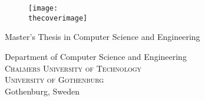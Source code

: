 
\newcommand{\oneLineTitle}{\thetitle}
\newcommand{\multiLineTitle}{\thetitle}

\begin{titlepage}

\addtolength{\voffset}{2cm}

\ifdefined\thecoverimage
\begin{figure}[H]
\centering
\vspace{1cm}
\texttt{[image: \\thecoverimage]}
\end{figure}
\else
\vspace{1cm}
\fi

\setlength{\parindent}{0cm}
\setlength{\parskip}{0cm}

\mbox{}
\vfill
{\sf
  \textbf{\Huge \multiLineTitle} \vspace{\baselineskip}\vspace{0.5cm}

  \ifdefined\thesubtitle
  {\Large \thesubtitle}  \vspace{\baselineskip}\vspace{0.5cm}
  \fi

  Master's Thesis in Computer Science and Engineering

  \vspace{1em}

  {\Large \theauthor}

  \vspace{2.9cm}

  Department of Computer Science and Engineering \\
  {\normalfont \textsc{Chalmers University of Technology}} \\
  {\normalfont \textsc{University of Gothenburg}} \\
  Gothenburg, Sweden \the\year
}

\end{titlepage}


\newpage
\restoregeometry
\thispagestyle{empty}
\mbox{}


